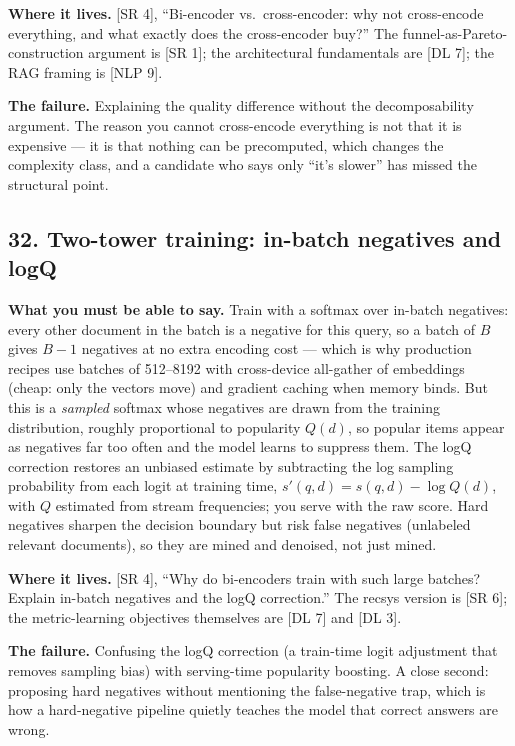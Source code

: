 \textbf{Where it lives.} [SR 4], ``Bi-encoder vs.\ cross-encoder: why not cross-encode everything, and what exactly does the cross-encoder buy?'' The funnel-as-Pareto-construction argument is [SR 1]; the architectural fundamentals are [DL 7]; the RAG framing is [NLP 9].

\textbf{The failure.} Explaining the quality difference without the decomposability argument. The reason you cannot cross-encode everything is not that it is expensive --- it is that nothing can be precomputed, which changes the complexity class, and a candidate who says only ``it's slower'' has missed the structural point.

\subsection*{32. Two-tower training: in-batch negatives and logQ}

\textbf{What you must be able to say.} Train with a softmax over in-batch negatives: every other document in the batch is a negative for this query, so a batch of $B$ gives $B - 1$ negatives at no extra encoding cost --- which is why production recipes use batches of 512--8192 with cross-device all-gather of embeddings (cheap: only the vectors move) and gradient caching when memory binds. But this is a \emph{sampled} softmax whose negatives are drawn from the training distribution, roughly proportional to popularity $Q(d)$, so popular items appear as negatives far too often and the model learns to suppress them. The logQ correction restores an unbiased estimate by subtracting the log sampling probability from each logit at training time, $s'(q,d) = s(q,d) - \log Q(d)$, with $Q$ estimated from stream frequencies; you serve with the raw score. Hard negatives sharpen the decision boundary but risk false negatives (unlabeled relevant documents), so they are mined and denoised, not just mined.

\textbf{Where it lives.} [SR 4], ``Why do bi-encoders train with such large batches? Explain in-batch negatives and the logQ correction.'' The recsys version is [SR 6]; the metric-learning objectives themselves are [DL 7] and [DL 3].

\textbf{The failure.} Confusing the logQ correction (a train-time logit adjustment that removes sampling bias) with serving-time popularity boosting. A close second: proposing hard negatives without mentioning the false-negative trap, which is how a hard-negative pipeline quietly teaches the model that correct answers are wrong.

